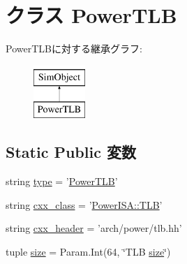 \hypertarget{classPowerTLB_1_1PowerTLB}{
\section{クラス PowerTLB}
\label{classPowerTLB_1_1PowerTLB}
}
PowerTLBに対する継承グラフ:\begin{figure}[H]
\begin{center}
\leavevmode
\includegraphics[height=2cm]{classPowerTLB_1_1PowerTLB}
\end{center}
\end{figure}
\subsection*{Static Public 変数}
\begin{DoxyCompactItemize}
\item 
string \hyperlink{classPowerTLB_1_1PowerTLB_acce15679d830831b0bbe8ebc2a60b2ca}{type} = '\hyperlink{classPowerTLB_1_1PowerTLB}{PowerTLB}'
\item 
string \hyperlink{classPowerTLB_1_1PowerTLB_a58cd55cd4023648e138237cfc0822ae3}{cxx\_\-class} = '\hyperlink{classPowerISA_1_1TLB}{PowerISA::TLB}'
\item 
string \hyperlink{classPowerTLB_1_1PowerTLB_a17da7064bc5c518791f0c891eff05fda}{cxx\_\-header} = 'arch/power/tlb.hh'
\item 
tuple \hyperlink{classPowerTLB_1_1PowerTLB_a377e5da8df1f89c5468c8b8cd07eac89}{size} = Param.Int(64, \char`\"{}TLB \hyperlink{classPowerTLB_1_1PowerTLB_a377e5da8df1f89c5468c8b8cd07eac89}{size}\char`\"{})
\end{DoxyCompactItemize}


